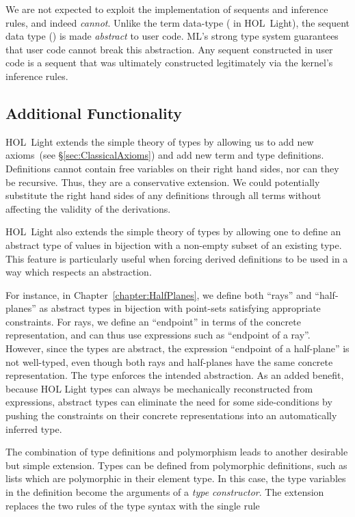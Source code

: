 We are not expected to exploit the implementation of sequents and inference rules, and indeed \emph{cannot}. Unlike the term data-type ( in HOL~Light), the sequent data type () is made \emph{abstract} to user code. ML's strong type system guarantees that user code cannot break this abstraction. Any sequent constructed in user code is a sequent that was ultimately constructed legitimately via the kernel's inference rules.

\subsection{Additional Functionality}
HOL~Light extends the simple theory of types by allowing us to add new axioms~(see \S\ref{sec:ClassicalAxioms}) and add new term and type definitions. Definitions cannot contain free variables on their right hand sides, nor can they be recursive. Thus, they are a conservative extension. We could potentially substitute the right hand sides of any definitions through all terms without affecting the validity of the derivations.

HOL~Light also extends the simple theory of types by allowing one to define an abstract type of values in bijection with a non-empty subset of an existing type. This feature is particularly useful when forcing derived definitions to be used in a way which respects an abstraction.

For instance, in Chapter~\ref{chapter:HalfPlanes}, we define both ``rays'' and ``half-planes'' as abstract types in bijection with point-sets satisfying appropriate constraints. For rays, we define an ``endpoint'' in terms of the concrete representation, and can thus use expressions such as ``endpoint of a ray''. However, since the types are abstract, the expression ``endpoint of a half-plane'' is not well-typed, even though both rays and half-planes have the same concrete representation. The type  enforces the intended abstraction. As an added benefit, because HOL Light types can always be mechanically reconstructed from expressions, abstract types can eliminate the need for some side-conditions by pushing the constraints on their concrete representations into an automatically inferred type.

The combination of type definitions and polymorphism leads to another desirable but simple extension. Types can be defined from polymorphic definitions, such as lists which are polymorphic in their element type. In this case, the type variables in the definition become the arguments of a \emph{type constructor}. The extension replaces the two rules of the type syntax with the single rule

